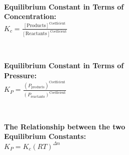 \\ \begin{minipage}{\textwidth}
    \textbf{Equilibrium Constant in Terms of \\Concentration:}
    \\ \( K_c = \displaystyle\frac{ [ \text{Products} ]^{\text{Coefficient}} }{ [ \text{Reactants} ]^{\text{Coefficient}} } \)
\end{minipage}
\\ \begin{minipage}{\textwidth}
    \textbf{Equilibrium Constant in Terms of \\Pressure:}
    \\ \( K_P = \displaystyle\frac{ ( P_{\text{products}} )^{\text{Coefficient}} }{ ( P_{\text{reactants}} )^{\text{Coefficient}} } \)
\end{minipage}
\\ \begin{minipage}{\textwidth}
    \textbf{The Relationship between the two \\Equilibrium Constants:}
    \\ \( K_P = K_c ( RT )^{\Delta n} \)
\end{minipage}
